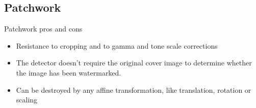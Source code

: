 \documentclass[a4paper, 12pt]{article}
\begin{document}
	\subsection{Patchwork}
	
	Patchwork pros and cons

	\begin{itemize}
		\item Resistance to cropping and to gamma and tone scale corrections
		\item The detector doesn’t require the original cover image to determine whether the image has been watermarked.
		\item Can be destroyed by any affine transformation, like translation, rotation or scaling
	\end{itemize}
\end{document}

